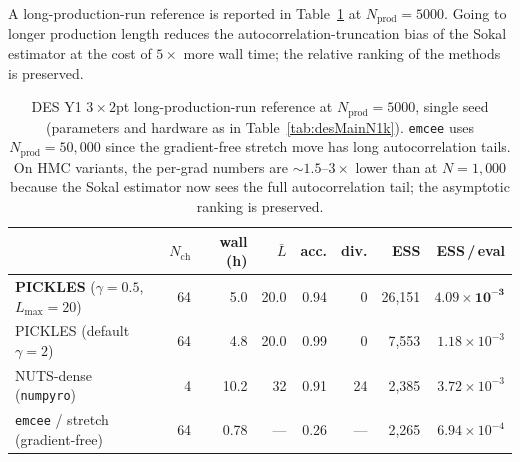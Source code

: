 \documentclass{article}
\begin{document}
A long-production-run reference is reported in
Table~\ref{tab:desMainN5k} at $N_{\text{prod}} = 5000$. Going to longer
production length reduces the autocorrelation-truncation bias of the
Sokal estimator at the cost of $5\times$ more wall time; the relative
ranking of the methods is preserved.

\begin{table}[t]
\centering
\caption{DES Y1 $3\times 2$pt long-production-run reference at
$N_{\text{prod}} = 5000$, single seed (parameters and hardware as in
Table~\ref{tab:desMainN1k}). \texttt{emcee} uses
$N_{\text{prod}} = 50{,}000$ since the gradient-free stretch move has
long autocorrelation tails. On HMC variants, the per-grad numbers are
$\sim\!1.5$--$3\times$ lower than at $N=1{,}000$ because the Sokal
estimator now sees the full autocorrelation tail; the asymptotic
ranking is preserved.}
\label{tab:desMainN5k}
\small
\begin{tabular}{l rrrrr rr}
\toprule
& $N_{\text{ch}}$ & wall (h) & $\bar L$ & acc. & div.
& ESS & ESS\,/\,eval \\
\midrule
\textbf{PICKLES} ($\gamma=0.5$, $L_{\max}=20$) & 64 & 5.0 & 20.0 & 0.94 & 0
   & 26{,}151 & $\mathbf{4.09\!\times\!10^{-3}}$ \\
PICKLES (default $\gamma=2$)
   & 64 & 4.8 & 20.0 & 0.99 & 0
   & 7{,}553 & $1.18\!\times\!10^{-3}$ \\
NUTS-dense (\texttt{numpyro}) & 4 & 10.2 & 32 & 0.91 & 24
   & 2{,}385 & $3.72\!\times\!10^{-3}$ \\
\texttt{emcee} / stretch (gradient-free)
   & 64 & 0.78 & --- & 0.26 & --- & 2{,}265 & $6.94\!\times\!10^{-4}$ \\
\bottomrule
\end{tabular}
\end{table}
\end{document}
